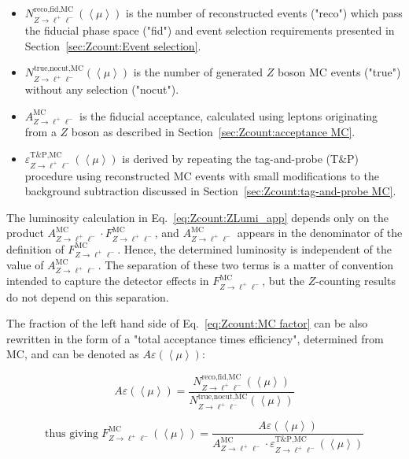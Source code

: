 \begin{itemize}
	\item $N^\text{reco,fid,MC}_{Z\rightarrow \ell^+\ell^-}(\left< \mu \right>)$ is the number of reconstructed events ("reco") which pass the fiducial phase space ("fid") and event selection requirements presented in Section~\ref{sec:Zcount:Event selection}.
	\item $N^\text{true,nocut,MC}_{Z\rightarrow \ell^+\ell^-}(\left< \mu \right>)$ is the number of generated $Z$ boson MC events ("true") without any selection ("nocut").
	\item $A^\text{MC}_{Z\rightarrow \ell^+\ell^-}$ is the fiducial acceptance, calculated using leptons originating from a $Z$ boson as described in Section~\ref{sec:Zcount:acceptance MC}.
	\item $\varepsilon^\text{T\&P,MC}_{Z\rightarrow \ell^+\ell^-}(\left< \mu \right>)$ is derived by repeating the tag-and-probe (T\&P) procedure using reconstructed MC events with small modifications to the background subtraction discussed in Section~\ref{sec:Zcount:tag-and-probe MC}.
\end{itemize}

The luminosity calculation in Eq.~\ref{eq:Zcount:ZLumi_app} depends only on the product $A^\text{MC}_{Z\rightarrow \ell^+\ell^-}\cdot F^\text{MC}_{Z\rightarrow \ell^+\ell^-}$, and $A^\text{MC}_{Z\rightarrow \ell^+\ell^-}$ appears in the denominator of the definition of $F^\text{MC}_{Z\rightarrow \ell^+\ell^-}$. Hence, the determined luminosity is independent of the value of $A^\text{MC}_{Z\rightarrow \ell^+\ell^-}$. The separation of these two terms is a matter of convention intended to capture the detector effects in $F^\text{MC}_{Z\rightarrow \ell^+\ell^-}$, but the $Z$-counting results do not depend on this separation.

The fraction of the left hand side of Eq.~\ref{eq:Zcount:MC factor} can be also rewritten in the form of a "total acceptance times efficiency", determined from MC, and can be denoted as $A\varepsilon(\left< \mu \right>)$:

\begin{equation}
A\varepsilon(\left< \mu \right>) = \frac{N^\text{reco,fid,MC}_{Z\rightarrow \ell^+\ell^-}(\left< \mu \right>)}{N^\text{true,nocut,MC}_{Z\rightarrow \ell^+\ell^-}(\left< \mu \right>)}
\end{equation}

\begin{equation}
\text{thus giving} \; F^\text{MC}_{Z\rightarrow \ell^+\ell^-}(\left< \mu \right>) = \frac{A\varepsilon(\left< \mu \right>)}{A^\text{MC}_{Z\rightarrow \ell^+\ell^-}\cdot \varepsilon^\text{T\&P,MC}_{Z\rightarrow \ell^+\ell^-}(\left< \mu \right>)}
\end{equation}


